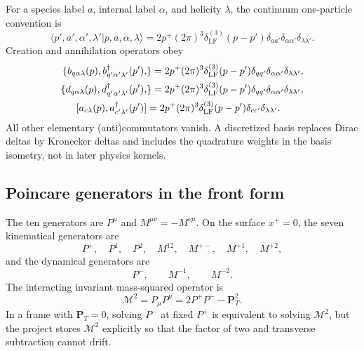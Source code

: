 \documentclass[11pt]{article}
\newcommand{\PT}{\bm{P}_{T}}
\newcommand{\LF}{\mathrm{LF}}
\newcommand{\cM}{\mathcal M}
\newcommand{\comm}[2]{[#1,#2]}
\newcommand{\acom}[2]{\{#1,#2\}}
\begin{document}
For a species label \(a\), internal label \(\alpha\), and helicity
\(\lambda\), the continuum one-particle convention is
\begin{equation}
 \langle p',a',\alpha',\lambda'|p,a,\alpha,\lambda\rangle
 =2p^+(2\pi)^3\delta^{(3)}_{\LF}(p-p')
 \delta_{aa'}\delta_{\alpha\alpha'}\delta_{\lambda\lambda'}.
\label{eq:one-particle-normalization}
\end{equation}
Creation and annihilation operators obey
\begin{align}
 \acom{b_{q\alpha\lambda}(p),b^\dagger_{q'\alpha'\lambda'}(p')}
 &=2p^+(2\pi)^3\delta^{(3)}_{\LF}(p-p')
 \delta_{qq'}\delta_{\alpha\alpha'}\delta_{\lambda\lambda'},
\label{eq:quark-algebra}\\
 \acom{d_{q\alpha\lambda}(p),d^\dagger_{q'\alpha'\lambda'}(p')}
 &=2p^+(2\pi)^3\delta^{(3)}_{\LF}(p-p')
 \delta_{qq'}\delta_{\alpha\alpha'}\delta_{\lambda\lambda'},
\label{eq:antiquark-algebra}\\
 \comm{a_{c\lambda}(p)}{a^\dagger_{c'\lambda'}(p')}
 &=2p^+(2\pi)^3\delta^{(3)}_{\LF}(p-p')
 \delta_{cc'}\delta_{\lambda\lambda'}.
\label{eq:gluon-algebra}
\end{align}
All other elementary (anti)commutators vanish.  A discretized basis replaces
Dirac deltas by Kronecker deltas and includes the quadrature weights in the
basis isometry, not in later physics kernels.

\subsection{Poincare generators in the front form}

The ten generators are \(P^\mu\) and \(M^{\mu\nu}=-M^{\nu\mu}\).  On the
surface \(x^+=0\), the seven kinematical generators are
\begin{equation}
 P^+,\quad P^1,\quad P^2,\quad M^{12},\quad M^{+-},
 \quad M^{+1},\quad M^{+2},
\label{eq:kinematical-generators}
\end{equation}
and the dynamical generators are
\begin{equation}
 P^-,\qquad M^{-1},\qquad M^{-2}.
\label{eq:dynamical-generators}
\end{equation}
The interacting invariant mass-squared operator is
\begin{equation}
 \cM^2
 =P_\mu P^\mu
 =2P^+P^- -\PT^2.
\label{eq:mass-operator}
\end{equation}
In a frame with \(\PT=0\), solving \(P^-\) at fixed \(P^+\) is equivalent
to solving \(\cM^2\), but the project stores \(\cM^2\) explicitly so that
the factor of two and transverse subtraction cannot drift.
\end{document}
